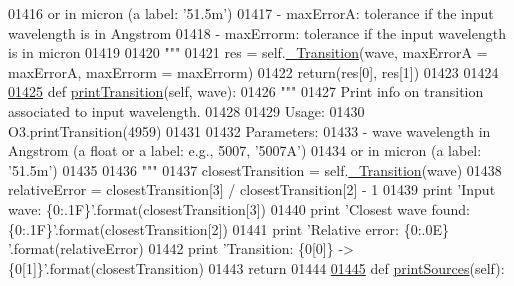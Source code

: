 \begin{DoxyCode}
{{01416 \textcolor{stringliteral}{                or in micron (a label: '51.5m')}
01417 \textcolor{stringliteral}{            - maxErrorA: tolerance if the input wavelength is in Angstrom}
01418 \textcolor{stringliteral}{            - maxErrorm: tolerance if the input wavelength is in micron}
01419 \textcolor{stringliteral}{                }
01420 \textcolor{stringliteral}{        """} 
01421         res = self.\hyperlink{classpyneb_1_1core_1_1pynebcore_1_1_atom_a69f29cc10c77910841f9e3ff8ddef250}{\_Transition}(wave, maxErrorA = maxErrorA, maxErrorm = maxErrorm)
01422         return(res[0], res[1])
01423         
01424 
\hypertarget{pynebcore_8py_source_l01425}{}\hyperlink{classpyneb_1_1core_1_1pynebcore_1_1_atom_a2e6b21ca9b8f63a8da2167bdaf0912f3}{01425}     \textcolor{keyword}{def }\hyperlink{classpyneb_1_1core_1_1pynebcore_1_1_atom_a2e6b21ca9b8f63a8da2167bdaf0912f3}{printTransition}(self, wave):
01426         \textcolor{stringliteral}{"""}
01427 \textcolor{stringliteral}{        Print info on transition associated to input wavelength.}
01428 \textcolor{stringliteral}{        }
01429 \textcolor{stringliteral}{        Usage:}
01430 \textcolor{stringliteral}{            O3.printTransition(4959)}
01431 \textcolor{stringliteral}{            }
01432 \textcolor{stringliteral}{        Parameters:}
01433 \textcolor{stringliteral}{            - wave      wavelength in Angstrom (a float or a label: e.g., 5007, '5007A') }
01434 \textcolor{stringliteral}{                or in micron (a label: '51.5m')}
01435 \textcolor{stringliteral}{                }
01436 \textcolor{stringliteral}{        """}
01437         closestTransition = self.\hyperlink{classpyneb_1_1core_1_1pynebcore_1_1_atom_a69f29cc10c77910841f9e3ff8ddef250}{\_Transition}(wave)
01438         relativeError = closestTransition[3] / closestTransition[2] - 1
01439         \textcolor{keywordflow}{print} \textcolor{stringliteral}{'Input wave: \{0:.1F\}'}.format(closestTransition[3])
01440         \textcolor{keywordflow}{print} \textcolor{stringliteral}{'Closest wave found: \{0:.1F\}'}.format(closestTransition[2])
01441         \textcolor{keywordflow}{print} \textcolor{stringliteral}{'Relative error: \{0:.0E\} '}.format(relativeError)
01442         \textcolor{keywordflow}{print} \textcolor{stringliteral}{'Transition: \{0[0]\} -> \{0[1]\}'}.format(closestTransition)
01443         \textcolor{keywordflow}{return}
01444     
\hypertarget{pynebcore_8py_source_l01445}{}\hyperlink{classpyneb_1_1core_1_1pynebcore_1_1_atom_af603fa94afcc5893bc55a72cafc3fdd5}{01445}     \textcolor{keyword}{def }\hyperlink{classpyneb_1_1core_1_1pynebcore_1_1_atom_af603fa94afcc5893bc55a72cafc3fdd5}{printSources}(self):
}}
\end{DoxyCode}
